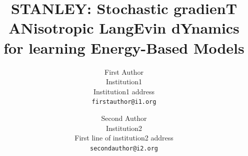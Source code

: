 \documentclass[10pt,twocolumn,letterpaper]{article}
\begin{document}
\title{STANLEY: \textbf{S}tochastic gradien\textbf{T} \textbf{AN}isotropic \textbf{L}ang\textbf{E}vin d\textbf{Y}namics for learning Energy-Based Models}

\author{First Author\\
Institution1\\
Institution1 address\\
{\tt\small firstauthor@i1.org}
\and
Second Author\\
Institution2\\
First line of institution2 address\\
{\tt\small secondauthor@i2.org}
}



\maketitle
\ificcvfinal\thispagestyle{empty}\fi
\end{document}
